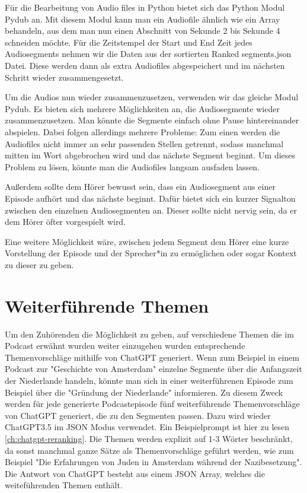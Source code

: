 Für die Bearbeitung von Audio files in Python bietet sich das Python Modul Pydub an. Mit diesem Modul kann man ein Audiofile ähnlich wie ein Array behandeln, aus dem man nun einen Abschnitt von Sekunde 2 bis Sekunde 4 schneiden möchte. 
Für die Zeitstempel der Start und End Zeit jedes Audiosegments nehmen wir die Daten aus der sortierten Ranked segments.json Datei.
Diese werden dann als extra Audiofiles abgespeichert und im nächsten Schritt wieder zusammengesetzt.

Um die Audios nun wieder zusammenzusetzen, verwenden wir das gleiche Modul Pydub. 
Es bieten sich mehrere Möglichkeiten an, die Audiosegmente wieder zusammenzusetzen. 
Man könnte die Segmente einfach ohne Pause hintereinander abspielen. Dabei folgen allerdings mehrere Probleme: 
Zum einen werden die Audiofiles nicht immer an sehr passenden Stellen getrennt, sodass manchmal mitten im Wort abgebrochen wird und das nächste Segment beginnt. 
Um dieses Problem zu lösen, könnte man die Audiofiles langsam ausfaden lassen.

Außerdem sollte dem Hörer bewusst sein, dass ein Audiosegment aus einer Episode aufhört und das nächste beginnt. 
Dafür bietet sich ein kurzer Signalton zwischen den einzelnen Audiosegmenten an. 
Dieser sollte nicht nervig sein, da er dem Hörer öfter vorgespielt wird. 

Eine weitere Möglichkeit wäre, zwischen jedem Segment dem Hörer eine kurze Vorstellung der Episode und der Sprecher*in zu ermöglichen oder sogar Kontext zu dieser zu geben. 

\section{Weiterführende Themen}

Um den Zuhörenden die Möglichkeit zu geben, auf verschiedene Themen die im Podcast erwähnt wurden weiter einzugehen wurden entsprechende Themenvorschläge mithilfe von ChatGPT generiert.
Wenn zum Beispiel in einem Podcast zur "Geschichte von Amsterdam" einzelne Segmente über die Anfangszeit der Niederlande handeln, könnte man sich in einer weiterführenen Episode zum Beispiel über die "Gründung der Niederlande" informieren.
Zu diesem Zweck werden für jede generierte Podcastepisode fünf weiterführende Themenvorschläge von ChatGPT generiert, die zu den Segmenten passen.
Dazu wird wieder ChatGPT3.5 im JSON Modus verwendet.
Ein Beispielprompt ist hier zu lesen \autoref{ch:chatgpt-reranking}.
Die Themen werden explizit auf 1-3 Wörter beschränkt, da sonst manchmal ganze Sätze als Themenvorschläge geführt werden, wie zum Beispiel "Die Erfahrungen von Juden in Amsterdam während der Nazibesetzung".
Die Antwort von ChatGPT besteht aus einem JSON Array, welches die weiteführenden Themen enthält.


